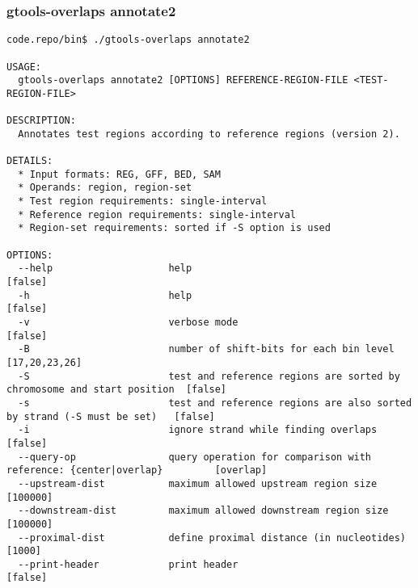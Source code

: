 \subsubsection{gtools-overlaps annotate2}\label{gtools-overlaps_annotate2}
\begin{lstlisting}
code.repo/bin$ ./gtools-overlaps annotate2

USAGE:
  gtools-overlaps annotate2 [OPTIONS] REFERENCE-REGION-FILE <TEST-REGION-FILE>

DESCRIPTION:
  Annotates test regions according to reference regions (version 2).

DETAILS:
  * Input formats: REG, GFF, BED, SAM
  * Operands: region, region-set
  * Test region requirements: single-interval
  * Reference region requirements: single-interval
  * Region-set requirements: sorted if -S option is used

OPTIONS:
  --help                    help                                                                    [false]
  -h                        help                                                                    [false]
  -v                        verbose mode                                                            [false]
  -B                        number of shift-bits for each bin level                                 [17,20,23,26]
  -S                        test and reference regions are sorted by chromosome and start position  [false]
  -s                        test and reference regions are also sorted by strand (-S must be set)   [false]
  -i                        ignore strand while finding overlaps                                    [false]
  --query-op                query operation for comparison with reference: {center|overlap}         [overlap]
  --upstream-dist           maximum allowed upstream region size                                    [100000]
  --downstream-dist         maximum allowed downstream region size                                  [100000]
  --proximal-dist           define proximal distance (in nucleotides)                               [1000]
  --print-header            print header                                                            [false]
\end{lstlisting}
%
